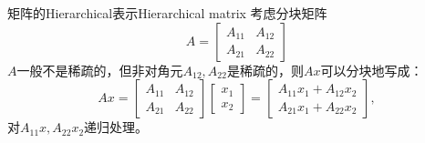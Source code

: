\begin{theorem}
    {矩阵的Hierarchical表示}{Hierarchical matrix}
    考虑分块矩阵
    \[
        A=\begin{bmatrix}
            A_{11}&A_{12}\\
            A_{21}&A_{22}
        \end{bmatrix}
    \]
    $A$一般不是稀疏的，但非对角元$A_{12},A_{22}$是稀疏的，则$Ax$可以分块地写成：
    \[
        Ax=\begin{bmatrix}
            A_{11}&A_{12}\\
            A_{21}&A_{22}
        \end{bmatrix}\begin{bmatrix}
            x_1\\x_2
        \end{bmatrix}=\begin{bmatrix}
            A_{11}x_1+A_{12}x_2\\
            A_{21}x_1+A_{22}x_2
        \end{bmatrix},
    \]
    对$A_{11}x,A_{22}x_2$递归处理。
\end{theorem}

